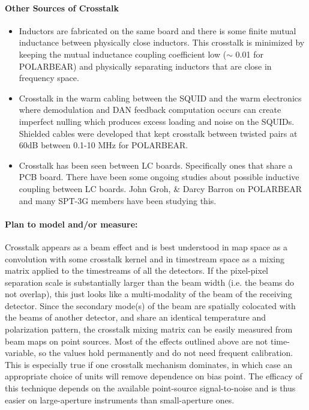 \paragraph{Other Sources of Crosstalk}
\begin{itemize}

\item Inductors are fabricated on the same board and there is some finite mutual inductance between physically close inductors. This crosstalk is minimized by keeping the mutual inductance coupling coefficient low ($\sim$ 0.01 for POLARBEAR) and physically separating inductors that are close in frequency space. 
\item Crosstalk in the warm cabling between the SQUID and the warm electronics where demodulation and DAN feedback computation occurs can create imperfect nulling which produces excess loading and noise on the SQUIDs. Shielded cables were developed that kept crosstalk between twisted pairs at 60dB between 0.1-10 MHz for POLARBEAR. \cite{DfMux_Warm_Crosstalk_Memo}
\item Crosstalk has been seen between LC boards. Specifically ones that share a PCB board. There have been some ongoing studies about possible inductive coupling between LC boards. John Groh, \& Darcy Barron on POLARBEAR and many SPT-3G members have been studying this.
\end{itemize}

\paragraph{Plan to model and/or measure:}

Crosstalk appears as a beam effect and is best understood in map space as a convolution with some crosstalk kernel and in timestream space as a mixing matrix applied to the timestreams of all the detectors.
If the pixel-pixel separation scale is substantially larger than the beam width (i.e. the beams do not overlap), this just looks like a multi-modality of the beam of the receiving detector.
Since the secondary mode(s) of the beam are spatially colocated with the beams of another detector, and share an identical temperature and polarization pattern, the crosstalk mixing matrix can be easily measured from beam maps on point sources.
Most of the effects outlined above are not time-variable, so the values hold permanently and do not need frequent calibration.
This is especially true if one crosstalk mechanism dominates, in which case an appropriate choice of units will remove dependence on bias point.
The efficacy of this technique depends on the available point-source signal-to-noise and is thus easier on large-aperture instruments than small-aperture ones.

